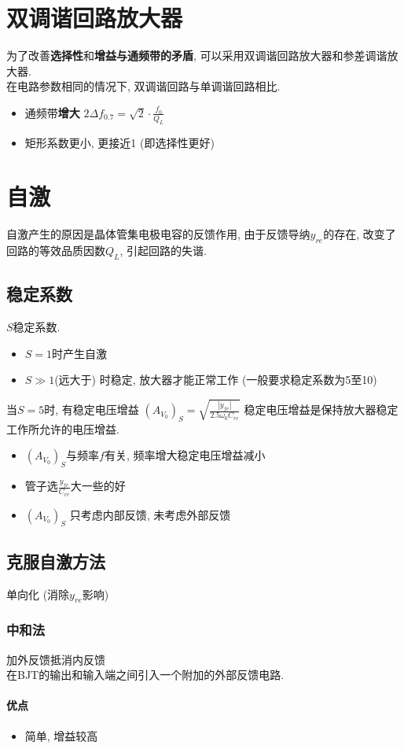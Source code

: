 \documentclass[a4paper]{report}
\begin{document}
\section{双调谐回路放大器}
为了改善\textbf{选择性}和\textbf{增益与通频带的矛盾}, 可以采用双调谐回路放大器和参差调谐放大器.\\
在电路参数相同的情况下, 双调谐回路与单调谐回路相比. 

\begin{itemize}
  \item 通频带\textbf{增大} $2\Delta f_{0.7}=\sqrt{2}\cdot \frac{f_0}{Q_L}$
  \item 矩形系数更小, 更接近1 (即选择性更好)
\end{itemize}
\section{自激}
自激产生的原因是晶体管集电极电容的反馈作用, 由于反馈导纳$y_{re}$的存在, 改变了回路的等效品质因数$Q_L$, 引起回路的失谐.  
\subsection{稳定系数}
$S$稳定系数. 
\begin{itemize}
  \item $S=1$时产生自激
  \item $S\gg 1$(远大于) 时稳定, 放大器才能正常工作 (一般要求稳定系数为5至10)
\end{itemize}
当$S=5$时, 有稳定电压增益 $(A_{V_0})_S=\sqrt{\frac{|y_{fe}|}{2.5\omega_0 C_{re}}}$ 
稳定电压增益是保持放大器稳定工作所允许的电压增益. 
\begin{itemize}
  \item $(A_{V_0})_S$与频率$f$有关, 频率增大稳定电压增益减小
  \item 管子选$\frac{y_{fe}}{C_{re}}$大一些的好
  \item $(A_{V_0})_S$ 只考虑内部反馈, 未考虑外部反馈
\end{itemize}
\subsection{克服自激方法}
单向化 (消除$y_{re}$影响)
\subsubsection{中和法}
加外反馈抵消内反馈\\
在BJT的输出和输入端之间引入一个附加的外部反馈电路. 
\paragraph{优点}
\begin{itemize}
  \item 简单, 增益较高
\end{itemize}
\end{document}
